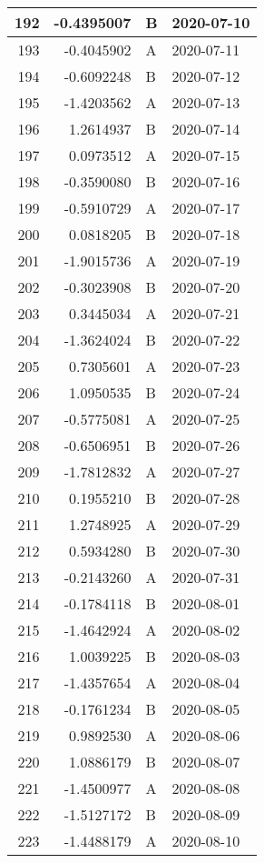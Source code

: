 \begin{tabular}{r|r|l|l}
\hline
192 & -0.4395007 & B & 2020-07-10\\
\hline
193 & -0.4045902 & A & 2020-07-11\\
\hline
194 & -0.6092248 & B & 2020-07-12\\
\hline
195 & -1.4203562 & A & 2020-07-13\\
\hline
196 & 1.2614937 & B & 2020-07-14\\
\hline
197 & 0.0973512 & A & 2020-07-15\\
\hline
198 & -0.3590080 & B & 2020-07-16\\
\hline
199 & -0.5910729 & A & 2020-07-17\\
\hline
200 & 0.0818205 & B & 2020-07-18\\
\hline
201 & -1.9015736 & A & 2020-07-19\\
\hline
202 & -0.3023908 & B & 2020-07-20\\
\hline
203 & 0.3445034 & A & 2020-07-21\\
\hline
204 & -1.3624024 & B & 2020-07-22\\
\hline
205 & 0.7305601 & A & 2020-07-23\\
\hline
206 & 1.0950535 & B & 2020-07-24\\
\hline
207 & -0.5775081 & A & 2020-07-25\\
\hline
208 & -0.6506951 & B & 2020-07-26\\
\hline
209 & -1.7812832 & A & 2020-07-27\\
\hline
210 & 0.1955210 & B & 2020-07-28\\
\hline
211 & 1.2748925 & A & 2020-07-29\\
\hline
212 & 0.5934280 & B & 2020-07-30\\
\hline
213 & -0.2143260 & A & 2020-07-31\\
\hline
214 & -0.1784118 & B & 2020-08-01\\
\hline
215 & -1.4642924 & A & 2020-08-02\\
\hline
216 & 1.0039225 & B & 2020-08-03\\
\hline
217 & -1.4357654 & A & 2020-08-04\\
\hline
218 & -0.1761234 & B & 2020-08-05\\
\hline
219 & 0.9892530 & A & 2020-08-06\\
\hline
220 & 1.0886179 & B & 2020-08-07\\
\hline
221 & -1.4500977 & A & 2020-08-08\\
\hline
222 & -1.5127172 & B & 2020-08-09\\
\hline
223 & -1.4488179 & A & 2020-08-10\\

\end{tabular}
